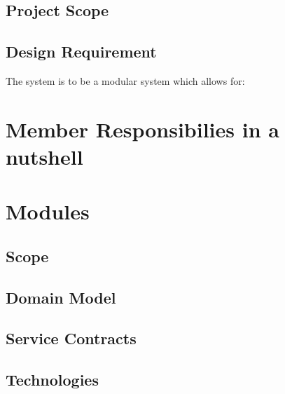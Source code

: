 \documentclass[12pt]{article}
\begin{document}
		 \subsection{Project Scope}

		 \subsection{Design Requirement}
		 	 The system is to be a modular system which allows for:

	 \section{Member Responsibilies in a nutshell}

	 \section{Modules}
	 	 \subsection{Scope}

	 	 \subsection{Domain Model}

	 	 \subsection{Service Contracts}
	 	 
		 \subsection{Technologies}
\end{document}
